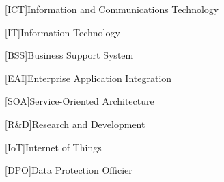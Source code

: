 \begin{acronym}

[ICT]{Information and Communications Technology}%

[IT]{Information Technology}%

[BSS]{Business Support System}%

[EAI]{Enterprise Application Integration}%

[SOA]{Service-Oriented Architecture}%

[R\&D]{Research and Development}%

[IoT]{Internet of Things}%

[DPO]{Data Protection Officier}%


\end{acronym}
